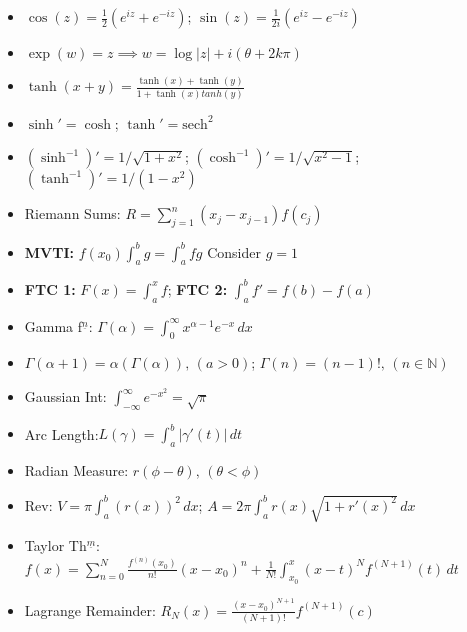 \documentclass[10pt]{article}
\begin{document}
\begin{multicols}{2}
\begin{itemize}
    \item $\cos(z)=\frac{1}{2}(e^{iz}+e^{-iz})$; $\sin(z)=\frac{1}{2i}(e^{iz}-e^{-iz})$
    \item $\exp(w)=z\implies w=\log|z|+i(\theta+2k\pi)$
    \item $\tanh(x+y)=\frac{\tanh(x)+\tanh(y)}{1+\tanh(x)tanh(y)}$
    \item $\sinh'=\cosh$; $\tanh{}'=\text{sech}^{2}$
    \item $(\sinh^{-1})'=1/\sqrt{1+x^{2}}$; $(\cosh^{-1})'=1/\sqrt{x^{2}-1}$; $(\tanh^{-1})'=1/(1-x^{2})$
    \item Riemann Sums: $R=\sum^{n}_{j=1}(x_{j}-x_{j-1})f(c_{j})$
    \item \textbf{MVTI:} $f(x_{0})\int^{b}_{a}g=\int^{b}_{a}fg$ Consider $g=1$
    \item \textbf{FTC 1:} $F(x)=\int^{x}_{a}f$; \textbf{FTC 2:} $\int^{b}_{a}f'=f(b)-f(a)$
    \item Gamma f$^{\underline{n}}$: $\Gamma(\alpha)=\int^{\infty}_{0}x^{\alpha-1}e^{-x}\,dx$
    \item $\Gamma(\alpha+1)=\alpha(\Gamma(\alpha)),\,(a>0)$; $\Gamma(n)=(n-1)!,\,(n\in\mathbb{N})$
    \item Gaussian Int: $\int^{\infty}_{-\infty}e^{-x^{2}}=\sqrt{\pi}$
    \item Arc Length:$L(\gamma)=\int^{b}_{a}|\gamma'(t)|\,dt$
    \item Radian Measure: $r(\phi-\theta),\,(\theta<\phi)$
    \item Rev: $V=\pi\int^{b}_{a}(r(x))^{2}\,dx$; $A=2\pi\int^{b}_{a}r(x)\sqrt{1+r'(x)^{2}}\,dx$
    \item Taylor Th$^{\underline{m}}$: $f(x)=\sum^{N}_{n=0}\frac{f^{(n)}(x_{0})}{n!}(x-x_{0})^{n}+\frac{1}{N!}\int^{x}_{x_{0}}(x-t)^{N}f^{(N+1)}(t)\,dt$
    \item Lagrange Remainder: $R_{N}(x)=\frac{(x-x_{0})^{N+1}}{(N+1)!}f^{(N+1)}(c)$
\end{itemize}
\end{multicols}

\newpage
{}
\end{document}
